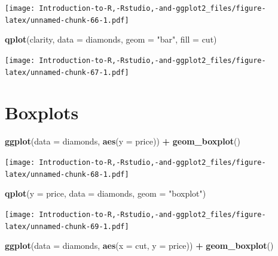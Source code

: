 \documentclass[]{book}
\newenvironment{Shaded}{\begin{snugshade}}{\end{snugshade}}
\newcommand{\DataTypeTok}[1]{\textcolor[rgb]{0.13,0.29,0.53}{#1}}
\newcommand{\KeywordTok}[1]{\textcolor[rgb]{0.13,0.29,0.53}{\textbf{#1}}}
\newcommand{\NormalTok}[1]{#1}
\newcommand{\OperatorTok}[1]{\textcolor[rgb]{0.81,0.36,0.00}{\textbf{#1}}}
\newcommand{\StringTok}[1]{\textcolor[rgb]{0.31,0.60,0.02}{#1}}
\begin{document}
\texttt{[image: Introduction-to-R,-Rstudio,-and-ggplot2\_files/figure-latex/unnamed-chunk-66-1.pdf]}

\begin{Shaded}
\begin{Highlighting}[]
\KeywordTok{qplot}\NormalTok{(clarity, }\DataTypeTok{data =}\NormalTok{ diamonds, }\DataTypeTok{geom =} \StringTok{"bar"}\NormalTok{, }\DataTypeTok{fill =}\NormalTok{ cut)}
\end{Highlighting}
\end{Shaded}

\texttt{[image: Introduction-to-R,-Rstudio,-and-ggplot2\_files/figure-latex/unnamed-chunk-67-1.pdf]}

\hypertarget{boxplots}{%
\section{Boxplots}\label{boxplots}}

\begin{Shaded}
\begin{Highlighting}[]
\KeywordTok{ggplot}\NormalTok{(}\DataTypeTok{data =}\NormalTok{ diamonds, }\KeywordTok{aes}\NormalTok{(}\DataTypeTok{y =}\NormalTok{ price)) }\OperatorTok{+}\StringTok{ }\KeywordTok{geom_boxplot}\NormalTok{() }
\end{Highlighting}
\end{Shaded}

\texttt{[image: Introduction-to-R,-Rstudio,-and-ggplot2\_files/figure-latex/unnamed-chunk-68-1.pdf]}

\begin{Shaded}
\begin{Highlighting}[]
\KeywordTok{qplot}\NormalTok{(}\DataTypeTok{y =}\NormalTok{ price, }\DataTypeTok{data =}\NormalTok{ diamonds, }\DataTypeTok{geom =} \StringTok{"boxplot"}\NormalTok{)}
\end{Highlighting}
\end{Shaded}

\texttt{[image: Introduction-to-R,-Rstudio,-and-ggplot2\_files/figure-latex/unnamed-chunk-69-1.pdf]}

\begin{Shaded}
\begin{Highlighting}[]
\KeywordTok{ggplot}\NormalTok{(}\DataTypeTok{data =}\NormalTok{ diamonds, }\KeywordTok{aes}\NormalTok{(}\DataTypeTok{x =}\NormalTok{ cut, }\DataTypeTok{y =}\NormalTok{ price)) }\OperatorTok{+}\StringTok{ }\KeywordTok{geom_boxplot}\NormalTok{() }
\end{Highlighting}
\end{Shaded}
\end{document}
